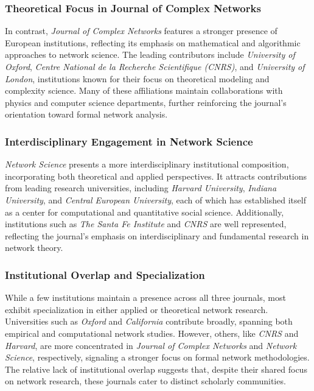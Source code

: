 \documentclass[twocolumn]{article}
\begin{document}
	\subsubsection*{Theoretical Focus in Journal of Complex Networks}
	
	In contrast, \textit{Journal of Complex Networks} features a stronger presence of European institutions, reflecting its emphasis on mathematical and algorithmic approaches to network science. The leading contributors include \textit{University of Oxford}, \textit{Centre National de la Recherche Scientifique (CNRS)}, and \textit{University of London}, institutions known for their focus on theoretical modeling and complexity science. Many of these affiliations maintain collaborations with physics and computer science departments, further reinforcing the journal’s orientation toward formal network analysis.
	
	\subsubsection*{Interdisciplinary Engagement in Network Science}
	
	\textit{Network Science} presents a more interdisciplinary institutional composition, incorporating both theoretical and applied perspectives. It attracts contributions from leading research universities, including \textit{Harvard University}, \textit{Indiana University}, and \textit{Central European University}, each of which has established itself as a center for computational and quantitative social science. Additionally, institutions such as \textit{The Santa Fe Institute} and \textit{CNRS} are well represented, reflecting the journal’s emphasis on interdisciplinary and fundamental research in network theory.
	
	\subsubsection*{Institutional Overlap and Specialization}
	
	While a few institutions maintain a presence across all three journals, most exhibit specialization in either applied or theoretical network research. Universities such as \textit{Oxford} and \textit{California} contribute broadly, spanning both empirical and computational network studies. However, others, like \textit{CNRS} and \textit{Harvard}, are more concentrated in \textit{Journal of Complex Networks} and \textit{Network Science}, respectively, signaling a stronger focus on formal network methodologies. The relative lack of institutional overlap suggests that, despite their shared focus on network research, these journals cater to distinct scholarly communities.
	
\end{document}
